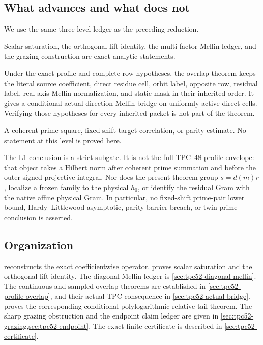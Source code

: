 \subsection{What advances and what does not}

We use the same three-level ledger as the preceding reduction.

\begin{description}[leftmargin=3.2em,style=nextline]
 \item[Level L0: exact algebra and boundary analysis.]
 Scalar saturation, the orthogonal-lift identity, the multi-factor
 Mellin ledger, and the grazing construction are exact analytic
 statements.
 \item[Level L1: physical coefficient interface.]
 Under the exact-profile and complete-row hypotheses, the overlap theorem
 keeps the literal source coefficient, direct
 residue cell, orbit label, opposite row, residual label, real-axis
 Mellin normalization, and static mask in their inherited order.  It
 gives a conditional actual-direction Mellin bridge on uniformly active
 direct cells.  Verifying those hypotheses for every inherited packet is
 not part of the theorem.
 \item[Level L2: arithmetic target.]
 A coherent prime square, fixed-shift target correlation, or parity
 estimate.  No statement at this level is proved here.
\end{description}

The L1 conclusion is a strict subgate.  It is not the full TPC--48
profile envelope: that object takes a Hilbert norm after coherent prime
summation and before the outer signed projective integral.  Nor does the
present theorem group \(s=d(m)r\), localize a frozen family to the
physical \(h_0\), or identify the residual Gram with the native affine
physical Gram.  In particular, no fixed-shift prime-pair lower bound,
Hardy--Littlewood asymptotic, parity-barrier breach, or twin-prime
conclusion is asserted.

\subsection{Organization}

 reconstructs the exact coefficientwise
operator.   proves scalar saturation
and the orthogonal-lift identity.  The diagonal Mellin ledger is
\cref{sec:tpc52-diagonal-mellin}.  The continuous and sampled overlap
theorems are established in \cref{sec:tpc52-profile-overlap}, and their
actual TPC consequence in \cref{sec:tpc52-actual-bridge}.
  proves the corresponding
 conditional polylogarithmic relative-tail theorem.  The sharp grazing obstruction and the endpoint
claim ledger are given in \cref{sec:tpc52-grazing,sec:tpc52-endpoint}.
The exact finite certificate is described in
\cref{sec:tpc52-certificate}.
